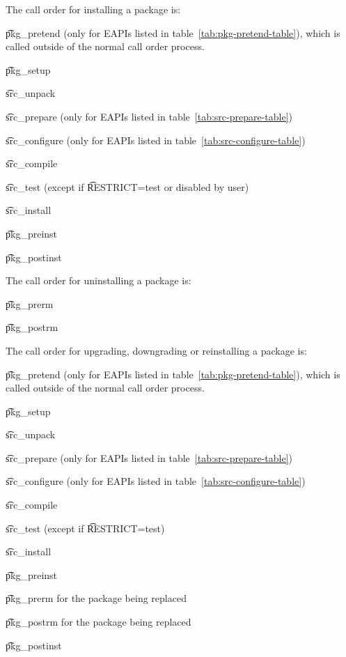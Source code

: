 The call order for installing a package is:

\begin{compactitem}
\item \t{pkg\_pretend} (only for EAPIs listed in table~\ref{tab:pkg-pretend-table}), which is called
    outside of the normal call order process.
\item \t{pkg\_setup}
\item \t{src\_unpack}
\item \t{src\_prepare} (only for EAPIs listed in table~\ref{tab:src-prepare-table})
\item \t{src\_configure} (only for EAPIs listed in table~\ref{tab:src-configure-table})
\item \t{src\_compile}
\item \t{src\_test} (except if \t{RESTRICT=test} or disabled by user)
\item \t{src\_install}
\item \t{pkg\_preinst}
\item \t{pkg\_postinst}
\end{compactitem}

The call order for uninstalling a package is:

\begin{compactitem}
\item \t{pkg\_prerm}
\item \t{pkg\_postrm}
\end{compactitem}

The call order for upgrading, downgrading or reinstalling a package is:

\begin{compactitem}
\item \t{pkg\_pretend} (only for EAPIs listed in table~\ref{tab:pkg-pretend-table}), which is called
    outside of the normal call order process.
\item \t{pkg\_setup}
\item \t{src\_unpack}
\item \t{src\_prepare} (only for EAPIs listed in table~\ref{tab:src-prepare-table})
\item \t{src\_configure} (only for EAPIs listed in table~\ref{tab:src-configure-table})
\item \t{src\_compile}
\item \t{src\_test} (except if \t{RESTRICT=test})
\item \t{src\_install}
\item \t{pkg\_preinst}
\item \t{pkg\_prerm} for the package being replaced
\item \t{pkg\_postrm} for the package being replaced
\item \t{pkg\_postinst}
\end{compactitem}

